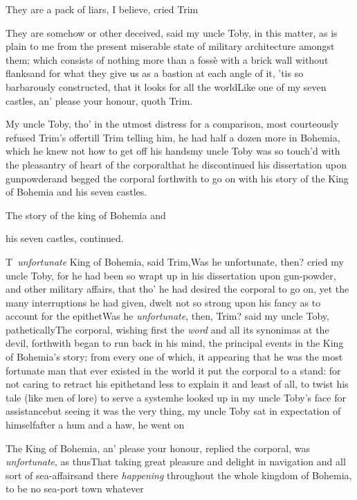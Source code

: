 \documentclass{article}
\begin{document}
\tsk They are a pack of liars, I believe, cried
Trim\tsh{}

\tsh They are somehow or other deceived, said my uncle
Toby, in this matter, as is plain to me from the present
miserable state of military architecture amongst them; which
consists of nothing more than a fossè with a brick wall without
flanks\tsk and for what they give us as a bastion at each angle
of it, ’tis so barbarously constructed, that it looks for all
the world\tsh \tsh Like one of my seven
castles, an’ please your honour, quoth Trim.

My uncle Toby, tho’ in the utmost distress for a
comparison, most courteously refused Trim’s
offer\tsk till Trim telling him, he had half a dozen more
in Bohemia, which he knew not how to get off his
hands\tsh my uncle Toby was so touch’d with
the pleasantry of heart of the corporal\tsh that he
discontinued his dissertation upon gunpowder\tsh and
begged the corporal forthwith to go on with his story of the King
of Bohemia and his seven castles.

\bigskip
\centerline{The story of the king of Bohemia and}
\centerline{his seven castles, continued.}

\lettrine{T}{\,} \textit{unfortunate} King of
Bohemia, said Trim,\tsh Was he unfortunate,
then? cried my uncle Toby, for he had been so wrapt up in
his dissertation upon gun-powder, and other military affairs, that
tho’ he had desired the corporal to go on, yet the many
interruptions he had given, dwelt not so strong upon his fancy as
to account for the epithet\tsh Was he \textit{unfortunate},
then, Trim? said my uncle Toby,
pathetically\break\tsh The corporal, wishing first the \textit{word} and
all its synonimas at the devil, forthwith began to run back in his
mind, the principal events in the King of Bohemia’s
story; from every one of which, it appearing that he was the most
fortunate man that ever existed in the world\tsh\break
it put the corporal to a stand: for not caring to retract his epithet\tsh and less
to explain it \tsh and least of all, to twist his tale (like men of lore) to serve a
system\tsh he looked up in my uncle Toby’s face for assistance\tsh but seeing it was
the very thing, my uncle Toby sat in expectation of himself\tsh after a hum and a
haw, he went on\tsh{}

The King of Bohemia, an’ please your honour,
replied the corporal, was \textit{unfortunate}, as
thus\tsh That taking great pleasure and delight in
navigation and all sort of sea-affairs\tsh and there
\textit{happening} throughout the whole kingdom of Bohemia, to
be no sea-port town whatever\tsh
\end{document}
